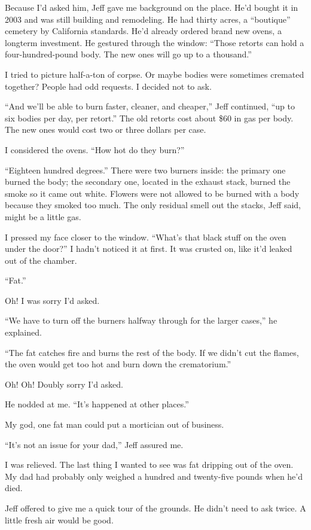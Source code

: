 \documentclass[12pt]{book}
\begin{document}
Because I'd asked him, Jeff gave me background on the place. He'd bought it in 2003 and was still building and remodeling. He had thirty acres, a ``boutique'' cemetery by California standards. He'd already ordered brand new ovens, a longterm investment. He gestured through the window: ``Those retorts can hold a four-hundred-pound body. The new ones will go up to a thousand.''

I tried to picture half-a-ton of corpse. Or maybe bodies were sometimes cremated together? People had odd requests. I decided not to ask.

``And we'll be able to burn faster, cleaner, and cheaper,'' Jeff continued, ``up to six bodies per day, per retort.'' The old retorts cost about \$60 in gas per body. The new ones would cost two or three dollars per case.

I considered the ovens. ``How hot do they burn?''

``Eighteen hundred degrees.'' There were two burners inside: the primary one burned the body; the secondary one, located in the exhaust stack, burned the smoke so it came out white. Flowers were not allowed to be burned with a body because they smoked too much. The only residual smell out the stacks, Jeff said, might be a little gas.

I pressed my face closer to the window. ``What's that black stuff on the oven under the door?'' I hadn't noticed it at first. It was crusted on, like it'd leaked out of the chamber.

``Fat.''

Oh! I was sorry I'd asked.

``We have to turn off the burners halfway through for the larger cases,'' he explained.

``The fat catches fire and burns the rest of the body. If we didn't cut the flames, the oven would get too hot and burn down the crematorium.''

Oh! Oh! Doubly sorry I'd asked.

He nodded at me. ``It's happened at other places.''

My god, one fat man could put a mortician out of business.

``It's not an issue for your dad,'' Jeff assured me.

I was relieved. The last thing I wanted to see was fat dripping out of the oven. My dad had probably only weighed a hundred and twenty-five pounds when he'd died.

Jeff offered to give me a quick tour of the grounds. He didn't need to ask twice. A little fresh air would be good.
\end{document}

